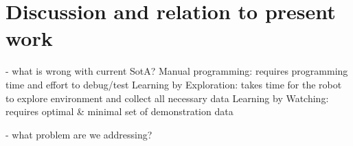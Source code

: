 \section{Discussion and relation to present work}
- what is wrong with current SotA?
Manual programming: requires programming time and effort to debug/test
Learning by Exploration: takes time for the robot to explore environment and collect all necessary data
Learning by Watching: requires optimal \& minimal set of demonstration data 

- what problem are we addressing? 
